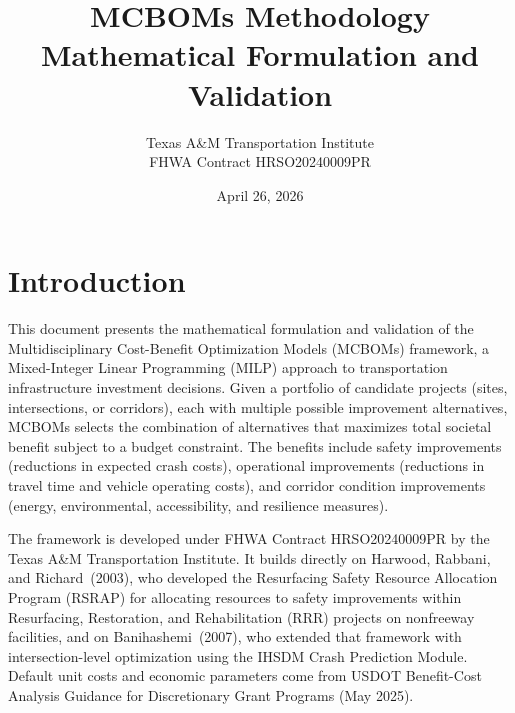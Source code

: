 \title{MCBOMs Methodology \\ \large Mathematical Formulation and Validation}
\author{Texas A\&M Transportation Institute \\ FHWA Contract HRSO20240009PR}
\date{April 26, 2026}



\maketitle

\tableofcontents
\newpage


\section*{Introduction}

This document presents the mathematical formulation and validation of the
Multidisciplinary Cost-Benefit Optimization Models (MCBOMs) framework, a
Mixed-Integer Linear Programming (MILP) approach to transportation
infrastructure investment decisions. Given a portfolio of candidate projects
(sites, intersections, or corridors), each with multiple possible improvement
alternatives, MCBOMs selects the combination of alternatives that maximizes
total societal benefit subject to a budget constraint. The benefits include
safety improvements (reductions in expected crash costs), operational
improvements (reductions in travel time and vehicle operating costs), and
corridor condition improvements (energy, environmental, accessibility, and
resilience measures).

The framework is developed under FHWA Contract HRSO20240009PR by the Texas
A\&M Transportation Institute. It builds directly on Harwood, Rabbani, and
Richard~(2003), who developed the Resurfacing Safety Resource Allocation
Program (RSRAP) for allocating resources to safety improvements within
Resurfacing, Restoration, and Rehabilitation (RRR) projects on nonfreeway
facilities, and on Banihashemi~(2007), who extended that framework with
intersection-level optimization using the IHSDM Crash Prediction Module.
Default unit costs and economic parameters come from USDOT Benefit-Cost
Analysis Guidance for Discretionary Grant Programs (May 2025).

